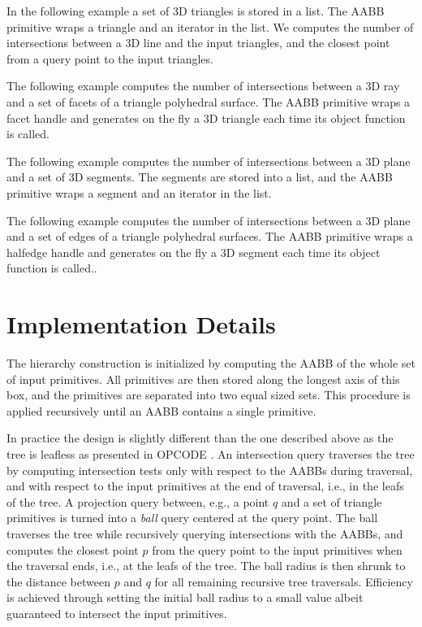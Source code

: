 In the following example a set of 3D triangles is stored in a list. The AABB primitive wraps a triangle and an iterator in the list. We computes the number of intersections between a 3D line and the input triangles, and the closest point from a query point to the input triangles.

The following example computes the number of intersections between a 3D ray and a set of facets of a triangle polyhedral surface. The AABB primitive wraps a facet handle and generates on the fly a 3D triangle each time its object function is called.

The following example computes the number of intersections between a 3D plane and a set of 3D segments. The segments are stored into a list, and the AABB primitive wraps a segment and an iterator in the list.

The following example computes the number of intersections between a 3D plane and a set of edges of a triangle polyhedral surfaces. The AABB primitive wraps a halfedge handle and generates on the fly a 3D segment each time its object function is called..

\section{Implementation Details}
\label{AABB_tree_section_details}

The hierarchy construction is initialized by computing the AABB of the whole set of input primitives. All primitives are then stored along the longest axis of this box, and the primitives are separated into two equal sized sets. This procedure is applied recursively until an AABB contains a single primitive. 

In practice the design is slightly different than the one described above as the tree is leafless as presented in OPCODE \cite{cgal:t-ocdl-05}. An intersection query traverses the tree by computing intersection tests only with respect to the AABBs during traversal, and with respect to the input primitives at the end of traversal, i.e., in the leafs of the tree. A projection query between, e.g., a point $q$ and a set of triangle primitives is turned into a \emph{ball} query centered at the query point. The ball traverses the tree while recursively querying intersections with the AABBs, and computes the closest point $p$ from the query point to the input primitives when the traversal ends, i.e., at the leafs of the tree. The ball radius is then shrunk to the distance between $p$ and $q$ for all remaining recursive tree traversals. Efficiency is achieved through setting the initial ball radius to a small value albeit guaranteed to intersect the input primitives.